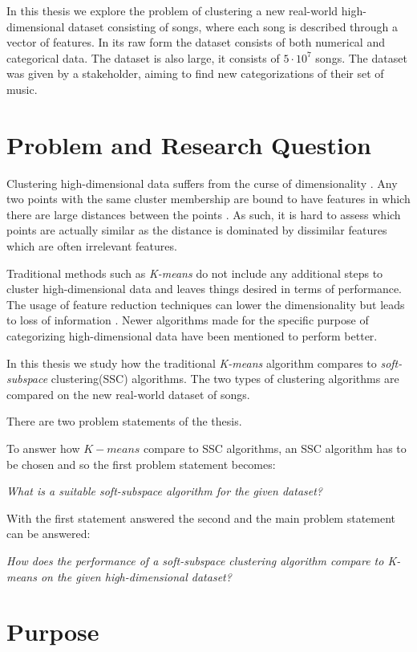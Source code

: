 \documentclass[../report.tex]{subfiles}
\begin{document}
In this thesis we explore the problem of clustering a new real-world high-dimensional dataset consisting of songs, where each song is described through a vector of features. In its raw form the dataset consists of both numerical and categorical data. The dataset is also large, it consists of $5 \cdot 10^7$ songs. The dataset was given by a stakeholder, aiming to find new categorizations of their set of music.

\section{Problem and Research Question}
Clustering high-dimensional data suffers from the curse of dimensionality \cite{Jain1999, Parsons2004, Deng2010}. Any two points with the same cluster membership are bound to have features in which there are large distances between the points \cite{Domeniconi2007}. As such, it is hard to assess which points are actually similar as the distance is dominated by dissimilar features which are often irrelevant features.

Traditional methods such as \textit{K-means} do not include any additional steps to cluster high-dimensional data and leaves things desired in terms of performance. The usage of feature reduction techniques can lower the dimensionality but leads to loss of information \cite{Gan2006}.  Newer algorithms made for the specific purpose of categorizing high-dimensional data have been mentioned to perform better.

In this thesis we study how the traditional \textit{K-means} algorithm compares to \textit{soft-subspace} clustering(SSC) algorithms. The two types of clustering algorithms are compared on the new real-world dataset of songs.

There are two problem statements of the thesis.

To answer how $K-means$ compare to SSC algorithms, an SSC algorithm has to be chosen and so the first problem statement becomes:

\textit{What is a suitable soft-subspace algorithm for the given dataset?}

With the first statement answered the second and the main problem statement can be answered:

\textit{How does the performance of a soft-subspace clustering algorithm compare to K-means on the given high-dimensional dataset?}

\section{Purpose}
\end{document}
